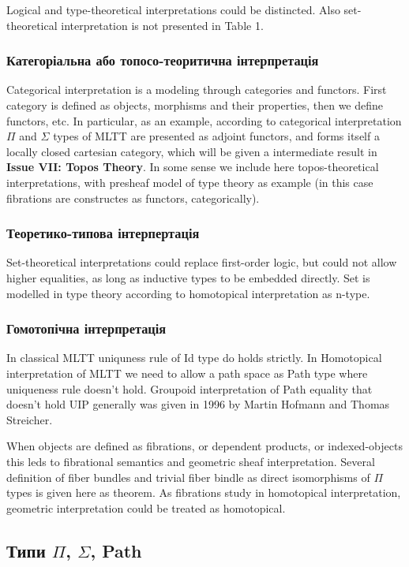 Logical and type-theoretical interpretations could be distincted. Also
set-theoretical interpretation is not presented in Table 1.

\subsubsection*{Категоріальна або топосо-теоритична інтерпретація}
Categorical interpretation is a modeling through categories and functors.
First category is defined as objects, morphisms and their properties, then
we define functors, etc. In particular, as an example, according to categorical
interpretation $\Pi$ and $\Sigma$ types of MLTT are presented as adjoint
functors, and forms itself a locally closed cartesian category, which will be given a
intermediate result in \textbf{Issue VII: Topos Theory}. In some sense we include here
topos-theoretical interpretations, with presheaf model of type theory as
example (in this case fibrations are constructes as functors, categorically).

\subsubsection*{Теоретико-типова інтерпертація}

Set-theoretical interpretations could replace first-order logic, but could not allow
higher equalities, as long as inductive types to be embedded directly. Set is modelled
in type theory according to homotopical interpretation as n-type.

\subsubsection*{Гомотопічна інтерпретація}
In classical MLTT uniquness rule of Id type do holds strictly. In Homotopical
interpretation of MLTT we need to allow a path space as Path type where uniqueness
rule doesn't hold. Groupoid interpretation of Path equality that doesn't hold UIP generally
was given in 1996 by Martin Hofmann and Thomas Streicher.

When objects are defined as fibrations, or dependent products, or indexed-objects
this leds to fibrational semantics and geometric sheaf interpretation. Several definition
of fiber bundles and trivial fiber bindle as direct isomorphisms of $\Pi$ types is
given here as theorem. As fibrations study in homotopical interpretation, geometric
interpretation could be treated as homotopical.

\subsection{Типи $\Pi$, $\Sigma$, Path}

